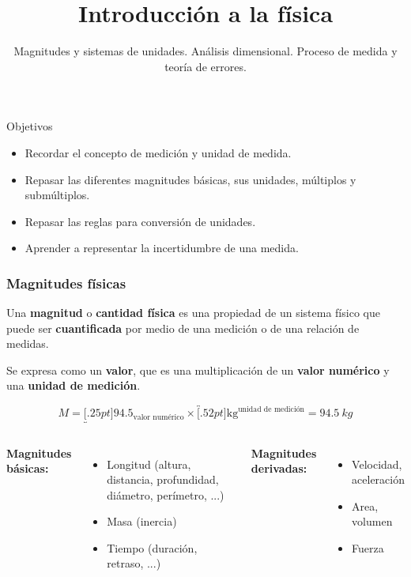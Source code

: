 \documentclass[9pt, aspectratio=169]{beamer}
\title{Introducción a la física}
\subtitle{Magnitudes y sistemas de unidades. Análisis dimensional. Proceso de medida y teoría de errores.}
\begin{document}
\maketitle

\begin{frame}{ Objetivos }

\begin{itemize}
 \item Recordar el concepto de medición y unidad de medida.
 \item Repasar las diferentes magnitudes básicas, sus unidades, múltiplos y submúltiplos.
 \item Repasar las reglas para conversión de unidades.
 \item Aprender a representar la incertidumbre de una medida.
\end{itemize}

\end{frame}

\begin{frame}
  \frametitle{Magnitudes físicas}
  \begin{definition}
    Una \textbf{magnitud} o \textbf{cantidad física} es una propiedad de un sistema físico que puede ser \textbf{cuantificada} por medio de una {medición} o de una relación de medidas.

    Se expresa como un \textbf{valor}, que es una multiplicación de un \textbf{valor numérico} y una \textbf{unidad de medición}.
  \end{definition}
\pause

\begin{example}
    \[ M = \underbracket[.25pt]{94.5}_{\text{valor numérico}} \times \overbracket[.52pt]{\text{kg}}^{\text{unidad de medición}} = \qty{94.5}{kg} \] 
\end{example}

\begin{columns}[t]
\cx
\textbf{Magnitudes básicas:}
\begin{itemize}
 \item Longitud (altura, distancia, profundidad, diámetro, perímetro, ...)
 \item Masa (inercia)
 \item Tiempo (duración, retraso, ...)
\end{itemize}
\cx
\textbf{Magnitudes derivadas:}
\begin{itemize}
    \item Velocidad, aceleración
    \item Area, volumen
    \item Fuerza
\end{itemize}
\end{columns}


\end{frame}
\end{document}

